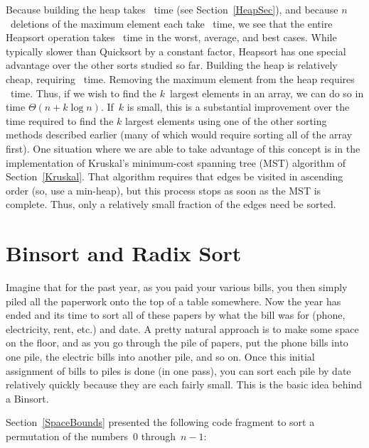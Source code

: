 
Because building the heap takes \Thetan\ time
(see Section~\ref{HeapSec}), and because \(n\)~deletions
of the maximum element each take \Thetalogn\ time, we see that the
entire Heapsort operation takes \Thetanlogn\ time in the worst,
average, and best cases.
While typically slower than Quicksort by a
constant factor, Heapsort has one special advantage over the other
sorts studied so far.
Building the heap is relatively cheap, requiring \Thetan\ time.
Removing the maximum element from the heap requires \Thetalogn\ time.
Thus, if we wish to find the \(k\)~largest
elements in an array, we can do so in time \(\Theta(n + k\log n)\).
If~\(k\) is small, this is a substantial improvement over the time
required to find the \(k\) largest elements using one of the other
sorting methods described earlier (many of which would require sorting
all of the array first).
One situation where we are able to take advantage of this concept is
in the implementation of Kruskal's minimum-cost spanning tree (MST)
algorithm of
Section~\ref{Kruskal}.
That algorithm requires that edges be visited in ascending
order (so, use a min-heap), but this process stops as soon as the MST
is complete.
Thus, only a relatively small fraction of the edges need be sorted.

\section{Binsort and Radix Sort}
\label{BinRadix}

Imagine that for the past year, as you paid your various bills, you
then simply piled all the paperwork onto the top of a table somewhere.
Now the year has ended and its time to sort all of these papers by
what the bill was for (phone, electricity, rent, etc.) and date.
A pretty natural approach is to make some space on the floor, and as
you go through the pile of papers, put the phone bills into one pile,
the electric bills into another pile, and so on.
Once this initial assignment of bills to piles is done (in one pass),
you can sort each pile by date relatively quickly because they are each
fairly small.
This is the basic idea behind a Binsort.

Section~\ref{SpaceBounds} presented the following code fragment to
sort a permutation of the numbers~0
through~\(n-1\):

